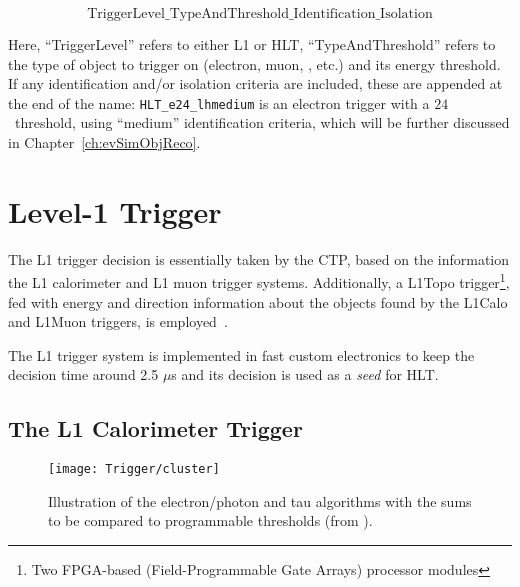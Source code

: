 		$$\mathrm{TriggerLevel\_TypeAndThreshold\_Identification\_Isolation}$$

		\noindent Here, ``TriggerLevel'' refers to either \ac{L1} or \ac{HLT}, ``TypeAndThreshold'' refers to the type of object to trigger on (electron, muon, \met, etc.) and its energy threshold. If any identification and/or isolation criteria are included, these are appended at the end of the name: \texttt{HLT\_e24\_lhmedium} is an electron trigger with a $24$ \GeV\ threshold, using ``medium'' identification criteria, which will be further discussed in Chapter~\ref{ch:evSimObjReco}. 



		
	\section{Level-1 Trigger}
	\label{sec:L1}

		The \ac{L1} trigger decision is essentially taken by the \ac{CTP}, based on the information the \ac{L1} calorimeter and \ac{L1} muon trigger systems. Additionally, a \ac{L1Topo} trigger\footnote{Two FPGA-based (Field-Programmable Gate Arrays) processor modules}, fed with energy and direction information about the objects found by the \ac{L1Calo} and \ac{L1Muon} triggers, is employed~\cite{ATLASJINST,ATLASTrigger2015,ATLASL1Topo}.

		The \ac{L1} trigger system is implemented in fast custom electronics to keep the decision time around 2.5 $\mu$s and its decision is used as a \emph{seed} for \ac{HLT}. 


		\subsection*{The L1 Calorimeter Trigger}

			\begin{wrapfigure}{L}{.5\textwidth}
				\centering
				\texttt{[image: Trigger/cluster]}
				\caption{\label{fig:calo_cluster} Illustration of the electron/photon and tau algorithms with the sums to be compared to programmable thresholds (from \cite{ATLASTrigger2010}).}
			\end{wrapfigure}


